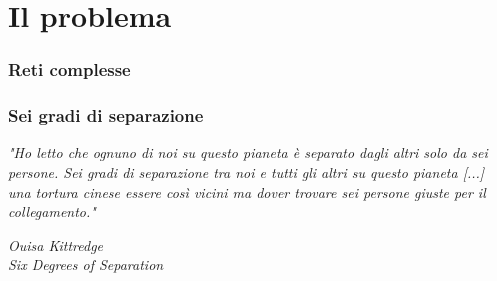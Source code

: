 \section{Il problema}

\begin{frame}
	\sectionpage
	\centering
\end{frame}

\begin{frame}
	\frametitle{Reti complesse}
	\centering
\end{frame}

\begin{frame}
	\frametitle{Sei gradi di separazione}
	\textit{"Ho letto che ognuno di noi su questo pianeta è separato dagli altri solo da sei persone. 
		Sei gradi di separazione tra noi e tutti gli altri su questo pianeta [...]\\ una tortura cinese essere così vicini ma dover trovare sei persone giuste per il collegamento."}
	\begin{flushright}
		\textit{Ouisa Kittredge}\\
		\textit{Six Degrees of Separation}
	\end{flushright}

	

\end{frame}
